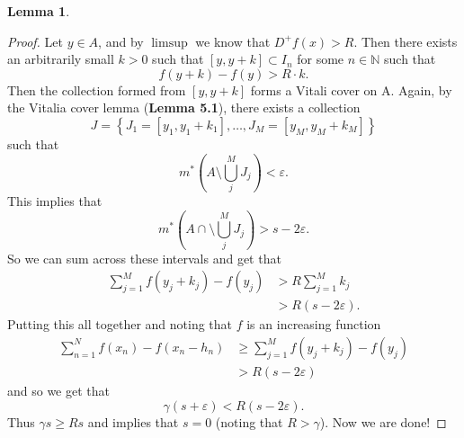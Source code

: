 \documentclass[12pt]{article}
\newcommand{\N}{\mathbb{N}}
\renewcommand{\epsilon}{\varepsilon}
\theoremstyle{definition}
\newtheorem*{lemma}{Lemma}
\begin{document}
\begin{lemma}
\begin{proof}
        Let \( y \in A \), and by \( \limsup \) we know that \( D^+f(x) > R \). Then there exists an arbitrarily small 
        \( k > 0 \) such that \( [y, y + k] \subset I_n \) for some \( n \in \N \) such that
            \[
                f(y + k )  - f(y) > R \cdot k. 
            \]
        Then the collection formed from \( [y, y+k] \) forms a Vitali cover on A. Again, by the Vitalia cover lemma (\textbf{Lemma 5.1}), there exists a collection \[J = \left\{  J_1 = [y_1, y_1 + k_1], \ldots, J_M = [y_M, y_M + k_M] \right\} \] such that 
            \[
                m^{*} \left( A \setminus \bigcup_{j}^{M} J_{j} \right) < \epsilon.
            \]
        This implies that 
            \[
                m^{*}\left( A \cap  \setminus \bigcup_{j}^{M} J_{j}\right) > s - 2 \epsilon.
            \]
        So we can sum across these intervals and get that
            \begin{align*}
                \sum_{j=1}^{M} f(y_j + k_j) - f(y_j) &> R \sum_{j=1}^{M} k_j \\
                &> R(s - 2\epsilon).
            \end{align*}
        Putting this all together and noting that \( f \) is an increasing function
            \begin{align*}
                \sum_{n=1}^{N} f(x_n) - f(x_n - h_n) &\geq \sum_{j=1}^{M}f(y_j + k_j) - f(y_j) \\
                &> R(s - 2\epsilon)
            \end{align*}
        and so we get that
            \[
                \gamma(s + \epsilon) < R(s - 2 \epsilon)  .
            \]
        Thus \( \gamma s \geq Rs \) and implies that \( s = 0 \) (noting that \( R > \gamma \)). Now we are done!
    \end{proof}
\end{lemma}
\end{document}
